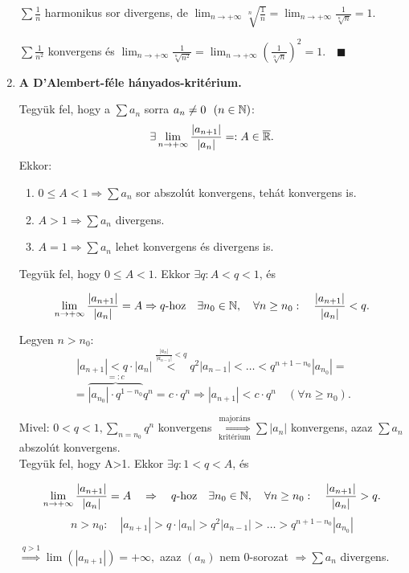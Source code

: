 \documentclass[a4paper,11.5pt]{article}
\begin{document}
\begin{enumerate}
		$\displaystyle\sum \frac{1}{n} $ harmonikus sor divergens, de $\displaystyle\lim_{n\to+\infty}\sqrt[n]{\frac{1}{n}}=\lim_{n\to+\infty}\frac{1}{\sqrt[n]{n}}=1.$
		
		$\displaystyle\sum\frac{1}{n^2}$ konvergens és $\displaystyle\lim_{n\to+\infty}\frac{1}{\sqrt[n]{n^2}}=\lim_{n\to+\infty}\left(\frac{1}{\sqrt[n]{n}}\right)^2=1.\quad\blacksquare$
		
		
		\item \textbf{A D'Alembert-féle hányados-kritérium.} 
		
		Tegyük fel, hogy a $\sum a_n$ sorra $a_n\not=0~~(n\in \mathbb{N})$:
		\[ \exists\lim_{n\to +\infty}\frac{|a_{n+1}|}{|a_n|} =: A\in \overline{\mathbb{R}} .\]
		Ekkor:
		\begin{enumerate}
			\item $0 \leq A <1 \Rightarrow \sum a_n$ sor abszolút konvergens, tehát konvergens is.
			\item $A>1 \Rightarrow \sum a_n$ divergens.
			\item $A=1 \Rightarrow \sum a_n$ lehet konvergens és divergens is.
		\end{enumerate}
		
		\biz Tegyük fel, hogy $0\leq A < 1$. Ekkor $\exists q: A<q<1$, és
		
		\[\displaystyle\lim_{n\to +\infty} \frac{|a_{n+1}|}{|a_n|}=A \Rightarrow q\text{-hoz}\quad\exists n_0 \in \mathbb{N}, \quad \forall n\geq n_0: \quad \frac{|a_{n+1}|}{|a_n|}<q.\]
		
		Legyen $n>n_0$:\quad\[|a_{n+1}|<q\cdot|a_n|\overset{\frac{|a_{n}|}{|a_{n-1}|}<q}{<} q^2|a_{n-1}|< \ldots < q^{n+1-n_0}|a_{n_0}|=\]\[ =\overbrace{|a_{n_0}|\cdot q^{1-n_0}}^{=:c}q^n=c\cdot q^n \Rightarrow |a_{n+1}|< c\cdot q^n \quad(\forall n \geq n_0).\]
		
		Mivel: $0<q<1, \displaystyle\sum_{n=n_0}q^n$ konvergens $\overset{\text{majoráns}}{\underset{\text{kritérium}}{\Longrightarrow}}\sum |a_n|$ konvergens, azaz $\sum a_n$ abszolút konvergens.\\
		
		Tegyük fel, hogy A>1. Ekkor $\exists q: 1<q<A$, és
		
		\[\displaystyle\lim_{n\to +\infty} \frac{|a_{n+1}|}{|a_n|}=A\quad  \Rightarrow\quad  q\text{-hoz}\quad\exists n_0 \in \mathbb{N}, \quad \forall n\geq n_0: \quad \frac{|a_{n+1}|}{|a_n|}>q.\]
		\[n>n_0:\quad|a_{n+1}|>q\cdot|a_n|> q^2|a_{n-1}|> \ldots > q^{n+1-n_0}|a_{n_0}|\]
		
		$ \overset{q>1}{\Longrightarrow}\lim(|a_{n+1}|)=+\infty,$ azaz $(a_n)$ nem 0-sorozat $\Rightarrow \sum a_n$ divergens.\\
		

\end{enumerate}
\end{document}
